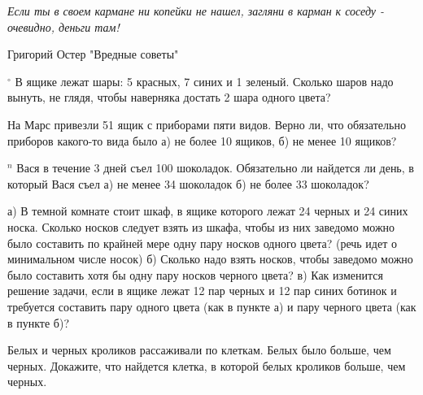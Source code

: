 \epigraph{\textit{Если ты в своем кармане ни копейки не нашел, загляни в карман к соседу - очевидно, деньги там!}}{Григорий Остер "Вредные советы"}
\begin{thm}$^\circ$
	В ящике лежат шары: 5 красных, 7 синих и 1 зеленый. Сколько шаров надо вынуть, не глядя, чтобы наверняка достать 2 шара одного цвета?
\end{thm}

\begin{thm}
	На Марс привезли 51 ящик с приборами пяти видов. Верно ли, что обязательно приборов какого-то вида было а) не более 10 ящиков, б) не менее 10 ящиков?
\end{thm}

\begin{thm}\label{2.3}
	$^n$ Вася в течение 3 дней съел 100 шоколадок. Обязательно ли найдется ли день, в который Вася съел а) не менее 34 шоколадок б) не более 33 шоколадок?
\end{thm}

%	

\begin{thm}
	а) В темной комнате стоит шкаф, в ящике которого лежат 24 черных и 24 синих носка. Сколько носков следует взять из шкафа, чтобы из них заведомо можно было составить по крайней мере одну пару носков одного цвета? (речь идет о минимальном числе носок)	
	б) Сколько надо взять носков, чтобы заведомо можно было составить хотя бы одну пару носков черного цвета?	
	в) Как изменится решение задачи, если в ящике лежат 12 пар черных и 12 пар синих ботинок и требуется составить пару одного цвета (как в пункте а) и пару черного цвета (как в пункте б)?
\end{thm}

\begin{thm}
	Белых и черных кроликов рассаживали по клеткам. Белых было больше, чем черных. Докажите, что найдется клетка, в которой белых кроликов больше, чем черных.
\end{thm}

